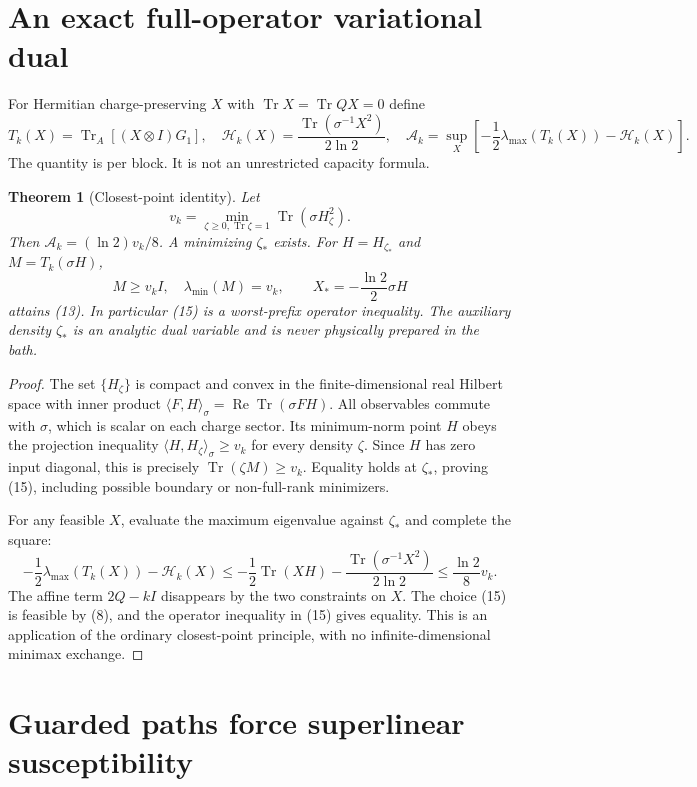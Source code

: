\documentclass[11pt]{article}
\newtheorem{theorem}{Theorem}[section]
\newcommand{\Tr}{\operatorname{Tr}}
\begin{document}
\section{An exact full-operator variational dual}

For Hermitian charge-preserving $X$ with $\Tr X=\Tr QX=0$ define
\[
 T_k(X)=\Tr_A[(X\otimes I)G_1],\quad
 \mathcal H_k(X)=\frac{\Tr(\sigma^{-1}X^2)}{2\ln2},\quad
 \mathcal A_k=\sup_X\left[-\frac12\lambda_{\max}(T_k(X))-
                               \mathcal H_k(X)\right].
 \tag{13}
\]
The quantity is per block. It is not an unrestricted capacity formula.

\begin{theorem}[Closest-point identity]\label{thm:dual}
Let
\[
 v_k=\min_{\zeta\ge0,\Tr\zeta=1}\Tr(\sigma H_\zeta^2).
 \tag{14}
\]
Then $\mathcal A_k=(\ln2)v_k/8$. A minimizing $\zeta_*$ exists.
For $H=H_{\zeta_*}$ and $M=T_k(\sigma H)$,
\[
 M\ge v_k I,\quad \lambda_{\min}(M)=v_k,\qquad
 X_*=-\frac{\ln2}{2}\sigma H
 \tag{15}
\]
attains (13). In particular (15) is a worst-prefix operator inequality.
The auxiliary density $\zeta_*$ is an analytic dual variable and is
never physically prepared in the bath.
\end{theorem}
\begin{proof}
The set $\{H_\zeta\}$ is compact and convex in the finite-dimensional
real Hilbert space with inner product
$\langle F,H\rangle_\sigma=\operatorname{Re}\Tr(\sigma FH)$.
All observables commute with $\sigma$, which is scalar on each charge
sector. Its minimum-norm point $H$ obeys the projection inequality
$\langle H,H_\zeta\rangle_\sigma\ge v_k$ for every density $\zeta$.
Since $H$ has zero input diagonal, this is precisely
$\Tr(\zeta M)\ge v_k$. Equality holds at $\zeta_*$, proving (15),
including possible boundary or non-full-rank minimizers.

For any feasible $X$, evaluate the maximum eigenvalue against
$\zeta_*$ and complete the square:
\[
 -\frac12\lambda_{\max}(T_k(X))-\mathcal H_k(X)
 \le-\frac12\Tr(XH)-\frac{\Tr(\sigma^{-1}X^2)}{2\ln2}
 \le\frac{\ln2}{8}v_k.
\]
The affine term $2Q-kI$ disappears by the two constraints on $X$.
The choice (15) is feasible by (8), and the operator inequality in
(15) gives equality. This is an application of the ordinary
closest-point principle, with no infinite-dimensional minimax exchange.
\end{proof}

\section{Guarded paths force superlinear susceptibility}
\end{document}
